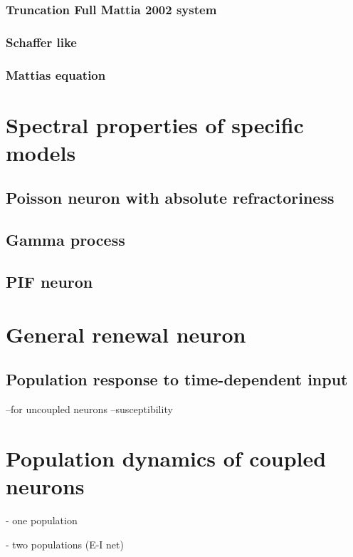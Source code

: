 \documentclass[a4paper,11pt,twoside]{article}
\numberwithin{equation}{section}
\begin{document}
\subsubsection{Truncation Full Mattia 2002 system}

\subsubsection{Schaffer like}

\subsubsection{Mattias equation}



\section{Spectral properties of specific models}
\label{sec:specif-model}


\subsection{Poisson neuron with absolute refractoriness}
\label{subsec:absref}

\subsection{Gamma process}

\subsection{PIF neuron}



\section{General renewal neuron}
\label{sec:gen-renw}

\subsection{Population response to time-dependent input}

--for uncoupled neurons
--susceptibility

\section{Population dynamics of coupled neurons}

- one population

- two populations (E-I net)



\end{document}
